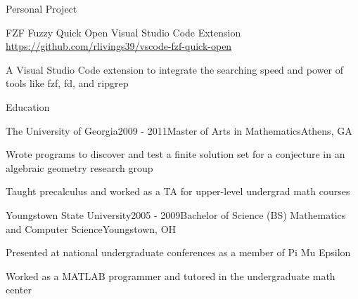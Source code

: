 \documentclass[
	usletter %
	10pt, %
]{resume} %
\begin{document}

\begin{rSection}{Personal Project}

\begin{rSubsection}{FZF Fuzzy Quick Open Visual Studio Code Extension\\ \url{https://github.com/rlivings39/vscode-fzf-quick-open}}{}{}{}
	\item A Visual Studio Code extension to integrate the searching speed and power of tools like fzf, fd, and ripgrep
\end{rSubsection}
\end{rSection}




\begin{rSection}{Education}
	\begin{rSubsection}{The University of Georgia}{2009 - 2011}{Master of Arts in Mathematics}{Athens, GA}
		\item Wrote programs to discover and test a finite solution set for a conjecture in an algebraic geometry research group
		\item Taught precalculus and worked as a TA for upper-level undergrad math courses
	\end{rSubsection}
	\begin{rSubsection}{Youngstown State University}{2005 - 2009}{Bachelor of Science (BS) Mathematics and Computer Science}{Youngstown, OH}
		\item Presented at national undergraduate conferences as a member of Pi Mu Epsilon
		\item Worked as a MATLAB programmer and tutored in the undergraduate math center
	\end{rSubsection}

\end{rSection}
\end{document}
